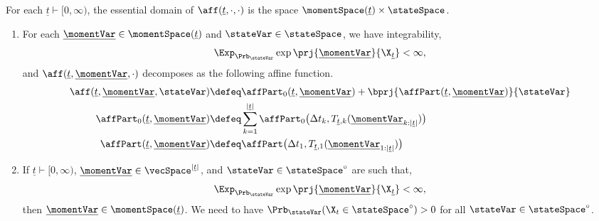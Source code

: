 \begin{theorem}
  \label{theorem:mgf-fdds}
  For each $\underline t \vdash [0,\infty)$, the essential domain of $\aff(\underline t, \cdot, \cdot)$ is the space $\momentSpace(\underline t) \times \stateSpace$.
  \begin{enumerate}[label=(\alph*)]
    \item
      \label{theorem:mgf-fdds:1}
      For each $\underline\momentVar \in \momentSpace(\underline t)$ and $\stateVar \in \stateSpace$, we have integrability,
      \begin{equation}
        \Exp_{\Prb_\stateVar} \exp\prj{\underline\momentVar}{\X_{\underline t}} < \infty,
      \end{equation}
      and $\aff(\underline t, \underline\momentVar, \cdot)$ decomposes as the following affine function.
      \begin{align}
        \aff(\underline t, \underline \momentVar, \stateVar) 
        &\defeq \affPart_0(\underline t, \underline \momentVar) + \bprj{\affPart(\underline t, \underline \momentVar)}{\stateVar} \\
        \affPart_0(\underline t, \underline\momentVar) &\defeq \sum_{k=1}^{|\underline t|} \affPart_0\big(\Delta t_k, T_{\underline t,k}(\underline \momentVar_{k:|\underline t|}) \big) \\
        \affPart(\underline t, \underline\momentVar) &\defeq \affPart\big(\Delta t_1, T_{\underline t, 1}(\underline\momentVar_{1:|\underline t|}) \big) 
      \end{align}
    \item
      \label{theorem:mgf-fdds:2}
      If $\underline t \vdash [0,\infty)$, $\underline\momentVar \in \vecSpace^{|\underline t|}$, and $\stateVar \in \stateSpace^\circ$ are such that,
      \begin{equation}
        \Exp_{\Prb_\stateVar}\exp\prj{\underline\momentVar}{\X_{\underline t}} < \infty,
      \end{equation}
      then $\underline\momentVar \in \momentSpace(\underline t)$.
      \color{red}
      We need to have $\Prb_\stateVar(\X_t \in \stateSpace^\circ) > 0$ for all $\stateVar \in \stateSpace^\circ$.
  \end{enumerate}
\end{theorem}

